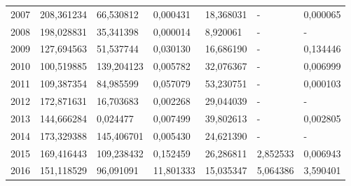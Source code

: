 \begin{table}
\begin{tabular}{p{1cm}p{2cm}p{2cm}p{2cm}p{2cm}p{2cm}p{2cm}}
 2007 &                       208,361234 &                                    66,530812 &                                 0,000431 &                      18,368031 &                                            - &                                   0,000065 \\
 2008 &                       198,028831 &                                    35,341398 &                                 0,000014 &                       8,920061 &                                            - &                                          - \\
 2009 &                       127,694563 &                                    51,537744 &                                 0,030130 &                      16,686190 &                                            - &                                   0,134446 \\
 2010 &                       100,519885 &                                   139,204123 &                                 0,005782 &                      32,076367 &                                            - &                                   0,006999 \\
 2011 &                       109,387354 &                                    84,985599 &                                 0,057079 &                      53,230751 &                                            - &                                   0,000103 \\
 2012 &                       172,871631 &                                    16,703683 &                                 0,002268 &                      29,044039 &                                            - &                                          - \\
 2013 &                       144,666284 &                                     0,024477 &                                 0,007499 &                      39,802613 &                                            - &                                   0,002805 \\
 2014 &                       173,329388 &                                   145,406701 &                                 0,005430 &                      24,621390 &                                            - &                                          - \\
 2015 &                       169,416443 &                                   109,238432 &                                 0,152459 &                      26,286811 &                                     2,852533 &                                   0,006943 \\
 2016 &                       151,118529 &                                    96,091091 &                                11,801333 &                      15,035347 &                                     5,064386 &                                   3,590401 \\
\bottomrule
\end{tabular}
\end{table}
